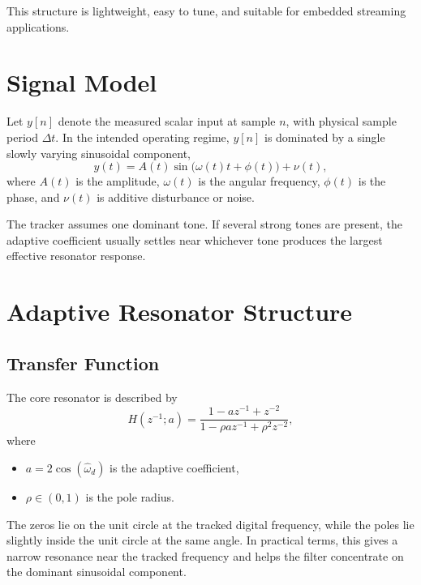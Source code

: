 \documentclass[conference]{IEEEtran}
\begin{document}
    This structure is lightweight, easy to tune, and suitable for embedded
    streaming applications.

    \section{Signal Model}

    Let $y[n]$ denote the measured scalar input at sample $n$, with physical
    sample period $\Delta t$. In the intended operating regime, $y[n]$ is
    dominated by a single slowly varying sinusoidal component,
    \begin{equation}\label{eq:signal}
    y(t) = A(t)\sin\!\bigl(\omega(t)t + \phi(t)\bigr) + \nu(t),
    \end{equation}
    where $A(t)$ is the amplitude, $\omega(t)$ is the angular frequency,
    $\phi(t)$ is the phase, and $\nu(t)$ is additive disturbance or noise.

    The tracker assumes one dominant tone. If several strong tones are present,
    the adaptive coefficient usually settles near whichever tone produces the
    largest effective resonator response.

    \section{Adaptive Resonator Structure}\label{sec:resonator}

    \subsection{Transfer Function}

    The core resonator is described by
    \begin{equation}\label{eq:tf}
    H(z^{-1};a)=
    \frac{1-a z^{-1}+z^{-2}}
    {1-\rho a z^{-1}+\rho^2 z^{-2}},
    \end{equation}
    where
    \begin{itemize}[leftmargin=1.4em]
        \item $a = 2\cos(\hat\omega_d)$ is the adaptive coefficient,
        \item $\rho \in (0,1)$ is the pole radius.
    \end{itemize}

    The zeros lie on the unit circle at the tracked digital frequency, while the
    poles lie slightly inside the unit circle at the same angle. In practical
    terms, this gives a narrow resonance near the tracked frequency and helps the
    filter concentrate on the dominant sinusoidal component.
\end{document}
